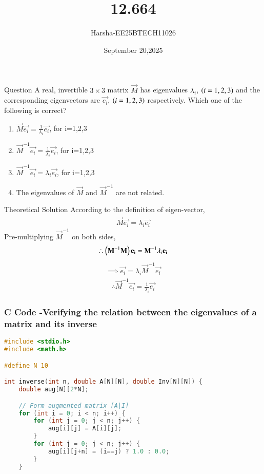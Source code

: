 \documentclass{beamer}
\title %
{12.664}
\date{September 20,2025}
\author %
{Harsha-EE25BTECH11026}
\begin{document}
\frame{\titlepage}


\begin{frame}{Question}
A real, invertible $3 \times 3$ matrix $\vec{M}$ has eigenvalues $\lambda_i$, $\left(i=1,2,3\right)$ and the corresponding eigenvectors are $\vec{e_i}$, $\left(i=1,2,3\right)$ respectively. Which one of the following is correct?
\begin{enumerate}
    \item $\vec{M}\vec{e_i}=\frac{1}{\lambda_i}\vec{e_i}$, for i=1,2,3
    \item $\vec{M}^{-1}\vec{e_i}=\frac{1}{\lambda_i}\vec{e_i}$, for i=1,2,3
    \item $\vec{M}^{-1}\vec{e_i}=\lambda_i\vec{e_i}$, for i=1,2,3
    \item The eigenvalues of $\vec{M}$ and $\vec{M}^{-1}$ are not related.
\end{enumerate}
\end{frame}

\begin{frame}{Theoretical Solution}
According to the definition of eigen-vector,
\begin{align}
    \vec{M}\vec{e_i}=\lambda_i\vec{e_i}
\end{align}
Pre-multiplying $\vec{M}^{-1}$ on both sides,
\begin{align}
    \therefore \left(\mathbf{M}^{-1}\mathbf{M}\right)\mathbf{e_i}=\mathbf{M}^{-1}\lambda_i\mathbf{e_i}
\end{align}
\begin{align}
    \implies \vec{e_i}=\lambda_i\vec{M}^{-1}\vec{e_i}
\end{align}
\begin{align}
    \therefore \vec{M}^{-1}\vec{e_i}=\frac{1}{\lambda_i}\vec{e_i}
\end{align}
\end{frame}

\begin{frame}[fragile]
    \frametitle{C Code -Verifying the relation between the eigenvalues of a matrix and its inverse}

    \begin{lstlisting}[language=C]
#include <stdio.h>
#include <math.h>

#define N 10  

int inverse(int n, double A[N][N], double Inv[N][N]) {
    double aug[N][2*N];

    // Form augmented matrix [A|I]
    for (int i = 0; i < n; i++) {
        for (int j = 0; j < n; j++) {
            aug[i][j] = A[i][j];
        }
        for (int j = 0; j < n; j++) {
            aug[i][j+n] = (i==j) ? 1.0 : 0.0;
        }
    }
    \end{lstlisting}
\end{frame}
\end{document}
